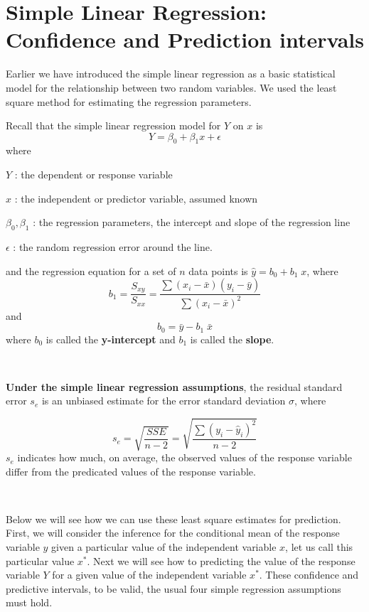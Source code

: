 \documentclass[
]{article}
\author{}
\date{\vspace{-2.5em}}
\begin{document}
\hypertarget{simple-linear-regression-confidence-and-prediction-intervals}{%
\section{Simple Linear Regression: Confidence and Prediction
intervals}\label{simple-linear-regression-confidence-and-prediction-intervals}}

Earlier we have introduced the simple linear regression as a basic
statistical model for the relationship between two random variables. We
used the least square method for estimating the regression parameters.

Recall that the simple linear regression model for \(Y\) on \(x\) is
\[Y=\beta_0+\beta_1 x+\epsilon\] where

\(Y\) : the dependent or response variable

\(x\) : the independent or predictor variable, assumed known

\(\beta_0,\beta_1\) : the regression parameters, the intercept and slope
of the regression line

\(\epsilon\) : the random regression error around the line.

and the regression equation for a set of \(n\) data points is
\(\hat{y}=b_0+b_1\;x\), where
\[b_1=\frac{S_{xy}}{S_{xx}}=\frac{\sum (x_i-\bar{x})(y_i-\bar{y})}{\sum (x_i-\bar{x})^2}\]
and \[b_0=\bar{y}-b_1\; \bar{x}\] where \(b_0\) is called the
\textbf{y-intercept} and \(b_1\) is called the \textbf{slope}.

\(~\)

\textbf{Under the simple linear regression assumptions}, the residual
standard error \(s_e\) is an unbiased estimate for the error standard
deviation \(\sigma\), where

\[s_e=\sqrt{\frac{SSE}{n-2}}=\sqrt{\frac{\sum(y_i-\hat{y}_i)^2}{n-2}} \]
\(s_e\) indicates how much, on average, the observed values of the
response variable differ from the predicated values of the response
variable.

\(~\)

Below we will see how we can use these least square estimates for
prediction. First, we will consider the inference for the conditional
mean of the response variable \(y\) given a particular value of the
independent variable \(x\), let us call this particular value \(x^*\).
Next we will see how to predicting the value of the response variable
\(Y\) for a given value of the independent variable \(x^*\). These
confidence and predictive intervals, to be valid, the usual four simple
regression assumptions must hold.
\end{document}

